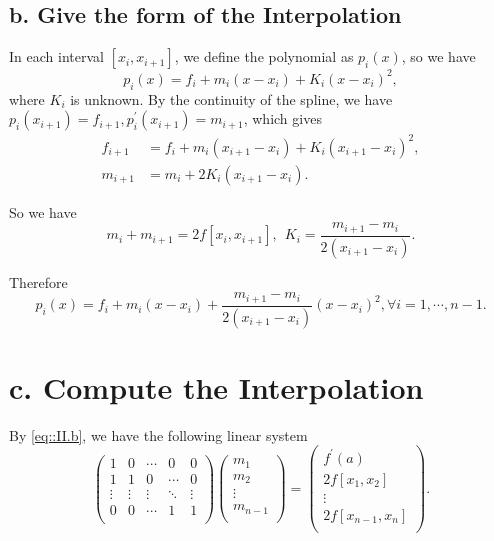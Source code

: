 \documentclass[a4paper]{article}
\begin{document}
\subsection*{b. Give the form of the Interpolation}

In each interval $ [x_{i}, x_{i+1}] $, we define the polynomial as $ p_i(x) $, so we have
\begin{equation}
    p_i(x) = f_i + m_i (x-x_i) + K_i(x-x_i)^{2},
\end{equation}
where $ K_i $ is unknown. By the continuity of the spline, we have $ p_i(x _{i+1}) = f _{i+1}, p_i ^{\prime}(x _{i+1}) = m _{i+1}$, which gives
\begin{equation}
    \begin{aligned}
        f_{i+1} &= f_i + m_i (x_{i+1}-x_i) + K_i(x_{i+1}-x_i) ^{2},\\
        m_{i+1} &= m_i + 2K_i(x_{i+1}-x_i).
    \end{aligned}
\end{equation}

So we have 
\begin{equation}
    m_i + m _{i+1} = 2 f[x _{i}, x _{i+1}], ~~ K_i = \frac{m_{i+1} - m_{i}}{2(x_{i+1}-x_i)}.
    \label{eq::II.b}
\end{equation}

Therefore
\begin{equation}
    p_i(x) = f_i + m_i (x-x_i) + \frac{m_{i+1} - m_{i}}{2(x_{i+1}-x_i)}(x-x_i)^2, \forall i = 1, \cdots, n-1.
\end{equation}

\section*{c. Compute the Interpolation}

By \eqref{eq::II.b}, we have the following linear system
\begin{equation}
    \begin{pmatrix}
        1 & 0 & \cdots & 0 & 0\\
        1 & 1 & 0 & \cdots & 0\\
        \vdots & \vdots & \vdots & \ddots & \vdots\\
        0 & 0 & \cdots & 1 & 1\\
    \end{pmatrix}
    \begin{pmatrix}
        m_1\\
        m_2\\
        \vdots\\
        m_{n-1}\\
    \end{pmatrix}
    =
    \begin{pmatrix}
        f ^{\prime} (a) \\
        2f[x_1, x_2]\\
        \vdots\\
        2f[x_{n-1}, x_n]\\
    \end{pmatrix}.
    \label{eq::II.c}
\end{equation}
\end{document}
